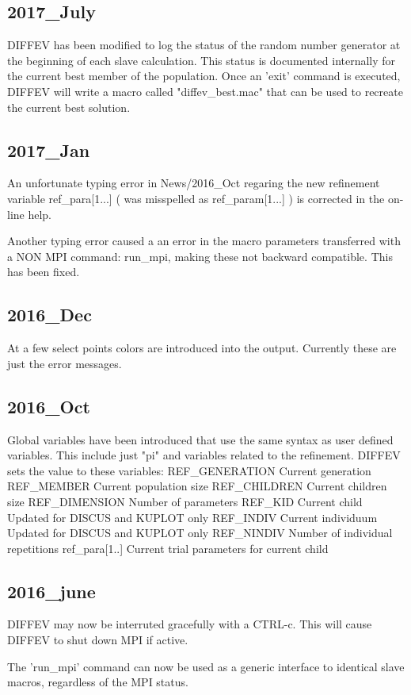 \subsection*{2017\_July}
DIFFEV has been modified to log the status of the random number generator 
at the beginning of each slave calculation. This status is documented 
internally for the current best member of the population. Once an 'exit' 
command is executed, DIFFEV will write a macro called "diffev\_best.mac" 
that can be used to recreate the current best solution. 
\subsection*{2017\_Jan}
An unfortunate typing error in News/2016\_Oct regaring the new 
refinement variable 
ref\_para[1...]   ( was misspelled as ref\_param[1...] ) 
is corrected in the  on-line help. 
\par
Another typing error caused a an error in the macro parameters 
transferred with a NON MPI command: run\_mpi, making these 
not backward compatible. This has been fixed. 
\subsection*{2016\_Dec}
\par
At a few select points colors are introduced into the output. 
Currently these are just the error messages. 
\par
\subsection*{2016\_Oct}
\par
Global variables have been introduced that use the same syntax as 
user defined variables. This include just "pi" and variables related 
to the refinement. 
DIFFEV sets the value to these variables: 
REF\_GENERATION  Current generation 
REF\_MEMBER      Current population size 
REF\_CHILDREN    Current children size 
REF\_DIMENSION   Number of parameters 
REF\_KID         Current child Updated for DISCUS and KUPLOT only 
REF\_INDIV       Current individuum Updated for DISCUS and KUPLOT only 
REF\_NINDIV      Number of individual repetitions 
ref\_para[1..]   Current trial parameters for current child 
\subsection*{2016\_june}
\par
DIFFEV may now be interruted gracefully with a CTRL-c. 
This will cause DIFFEV to shut down MPI if active. 
\par
The 'run\_mpi' command can now be used as a generic interface to identical 
slave macros, regardless of the MPI status. 
